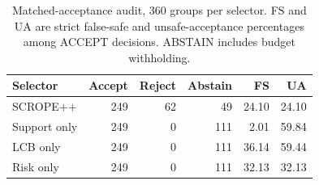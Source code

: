 \begin{table}[t]
\centering\scriptsize
\setlength{\tabcolsep}{3pt}
\caption{Matched-acceptance audit, 360 groups per selector. FS and UA are strict false-safe and unsafe-acceptance percentages among ACCEPT decisions. ABSTAIN includes budget withholding.}
\label{tab:reviewer_aligned}
\begin{tabular}{lrrrrr}
\toprule
Selector & Accept & Reject & Abstain & FS & UA \\
\midrule
SCROPE++ & 249 & 62 & 49 & 24.10 & 24.10 \\
Support only & 249 & 0 & 111 & 2.01 & 59.84 \\
LCB only & 249 & 0 & 111 & 36.14 & 59.44 \\
Risk only & 249 & 0 & 111 & 32.13 & 32.13 \\
\bottomrule
\end{tabular}
\end{table}

